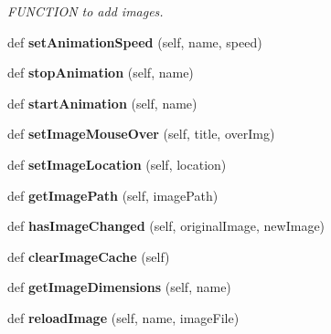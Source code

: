 \begin{DoxyCompactItemize}
\begin{DoxyCompactList}\small\item\em F\+U\+N\+C\+T\+I\+ON to add images. \end{DoxyCompactList}\item 
\mbox{\label{classappjar_1_1gui_a6b45a1374ae6f2a59b4db9d5d358d4d1}} 
def {\bfseries set\+Animation\+Speed} (self, name, speed)
\item 
\mbox{\label{classappjar_1_1gui_a5f1118d39fece6280a8f8e48caf2c591}} 
def {\bfseries stop\+Animation} (self, name)
\item 
\mbox{\label{classappjar_1_1gui_af17cc1e8320dd8918471470f5ac2d2a9}} 
def {\bfseries start\+Animation} (self, name)
\item 
\mbox{\label{classappjar_1_1gui_a42a69a9b9efa955d7c2f201722595e15}} 
def {\bfseries set\+Image\+Mouse\+Over} (self, title, over\+Img)
\item 
\mbox{\label{classappjar_1_1gui_ab0ff0d2751e74492d8752ae72732e0ab}} 
def {\bfseries set\+Image\+Location} (self, location)
\item 
\mbox{\label{classappjar_1_1gui_a3038c54f74e3a1510b82776035b918ed}} 
def {\bfseries get\+Image\+Path} (self, image\+Path)
\item 
\mbox{\label{classappjar_1_1gui_a7b8a784d5902b42fddf4016e1a203749}} 
def {\bfseries has\+Image\+Changed} (self, original\+Image, new\+Image)
\item 
\mbox{\label{classappjar_1_1gui_a48b2e9e635fd00db2c4e8af25aff7c2b}} 
def {\bfseries clear\+Image\+Cache} (self)
\item 
\mbox{\label{classappjar_1_1gui_a68b228ca67e8317a4e2358881aa658fd}} 
def {\bfseries get\+Image\+Dimensions} (self, name)
\item 
\mbox{\label{classappjar_1_1gui_a984b2a0319650bf0b191b34107cfdcad}} 
def {\bfseries reload\+Image} (self, name, image\+File)
\item 

\end{DoxyCompactItemize}
